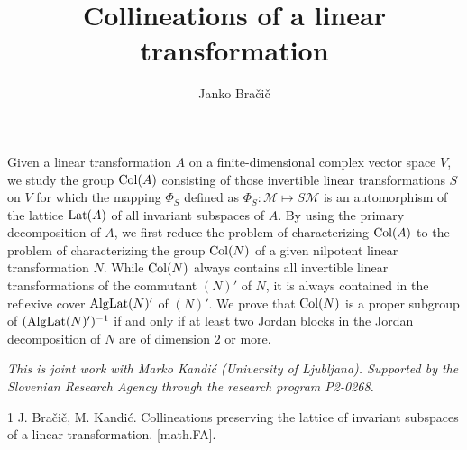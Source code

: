 \documentclass[a4paper]{amsart}
\date{}
\begin{document}
\title{Collineations of a linear transformation}
\author{Janko Bra\v{c}i\v{c}} %
\address{University of Ljubljana, Slovenia} %

\maketitle


Given a linear transformation $A$ on a finite-dimensional complex vector space $V$, we study the group ${\rm Col}(A)$ consisting of those invertible linear transformations $S$ on $V$ for which the mapping $\Phi_S$ defined as $\Phi_S\colon {\mathcal M}\mapsto S{\mathcal M}$ is an automorphism of the lattice ${\rm Lat}(A)$ of all invariant subspaces of $A$. By using the primary decomposition of $A$, we first reduce the problem of characterizing ${\rm Col}(A)$ to the problem of characterizing the group ${\rm Col}(N)$ of a given nilpotent linear transformation $N$. While ${\rm Col}(N)$ always contains all invertible linear transformations of the commutant $(N)'$ of $N$, it is always contained in the reflexive cover ${\rm Alg}{\rm Lat}(N)'$ of $(N)'$. We prove that ${\rm Col}(N)$ is a proper subgroup of $({\rm Alg}{\rm Lat}(N)')^{-1}$ if and only if at least two Jordan blocks in the Jordan decomposition of $N$ are of dimension $2$ or more. 

\emph{This is joint work with Marko Kandi\'{c} (University of Ljubljana).
Supported by the Slovenian Research Agency through the research program P2-0268.}

\begin{thebibliography}{1}
J. Bra\v{c}i\v{c}, M. Kandi\'{c}.
\newblock Collineations preserving the lattice of  invariant subspaces of a linear transformation.
  [math.FA].
\end{thebibliography}
\end{document}
